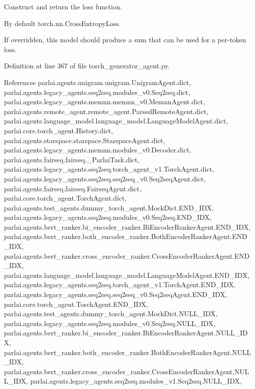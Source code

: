 \begin{DoxyVerb}Construct and return the loss function.

By default torch.nn.CrossEntropyLoss.

If overridden, this model should produce a sum that can be used for a per-token loss.
\end{DoxyVerb}
 

Definition at line 367 of file torch\+\_\+generator\+\_\+agent.\+py.



References parlai.\+agents.\+unigram.\+unigram.\+Unigram\+Agent.\+dict, parlai.\+agents.\+legacy\+\_\+agents.\+seq2seq.\+modules\+\_\+v0.\+Seq2seq.\+dict, parlai.\+agents.\+legacy\+\_\+agents.\+memnn.\+memnn\+\_\+v0.\+Memnn\+Agent.\+dict, parlai.\+agents.\+remote\+\_\+agent.\+remote\+\_\+agent.\+Parsed\+Remote\+Agent.\+dict, parlai.\+agents.\+language\+\_\+model.\+language\+\_\+model.\+Language\+Model\+Agent.\+dict, parlai.\+core.\+torch\+\_\+agent.\+History.\+dict, parlai.\+agents.\+starspace.\+starspace.\+Starspace\+Agent.\+dict, parlai.\+agents.\+legacy\+\_\+agents.\+memnn.\+modules\+\_\+v0.\+Decoder.\+dict, parlai.\+agents.\+fairseq.\+fairseq.\+\_\+\+Parlai\+Task.\+dict, parlai.\+agents.\+legacy\+\_\+agents.\+seq2seq.\+torch\+\_\+agent\+\_\+v1.\+Torch\+Agent.\+dict, parlai.\+agents.\+legacy\+\_\+agents.\+seq2seq.\+seq2seq\+\_\+v0.\+Seq2seq\+Agent.\+dict, parlai.\+agents.\+fairseq.\+fairseq.\+Fairseq\+Agent.\+dict, parlai.\+core.\+torch\+\_\+agent.\+Torch\+Agent.\+dict, parlai.\+agents.\+test\+\_\+agents.\+dummy\+\_\+torch\+\_\+agent.\+Mock\+Dict.\+E\+N\+D\+\_\+\+I\+DX, parlai.\+agents.\+legacy\+\_\+agents.\+seq2seq.\+modules\+\_\+v0.\+Seq2seq.\+E\+N\+D\+\_\+\+I\+DX, parlai.\+agents.\+bert\+\_\+ranker.\+bi\+\_\+encoder\+\_\+ranker.\+Bi\+Encoder\+Ranker\+Agent.\+E\+N\+D\+\_\+\+I\+DX, parlai.\+agents.\+bert\+\_\+ranker.\+both\+\_\+encoder\+\_\+ranker.\+Both\+Encoder\+Ranker\+Agent.\+E\+N\+D\+\_\+\+I\+DX, parlai.\+agents.\+bert\+\_\+ranker.\+cross\+\_\+encoder\+\_\+ranker.\+Cross\+Encoder\+Ranker\+Agent.\+E\+N\+D\+\_\+\+I\+DX, parlai.\+agents.\+language\+\_\+model.\+language\+\_\+model.\+Language\+Model\+Agent.\+E\+N\+D\+\_\+\+I\+DX, parlai.\+agents.\+legacy\+\_\+agents.\+seq2seq.\+torch\+\_\+agent\+\_\+v1.\+Torch\+Agent.\+E\+N\+D\+\_\+\+I\+DX, parlai.\+agents.\+legacy\+\_\+agents.\+seq2seq.\+seq2seq\+\_\+v0.\+Seq2seq\+Agent.\+E\+N\+D\+\_\+\+I\+DX, parlai.\+core.\+torch\+\_\+agent.\+Torch\+Agent.\+E\+N\+D\+\_\+\+I\+DX, parlai.\+agents.\+test\+\_\+agents.\+dummy\+\_\+torch\+\_\+agent.\+Mock\+Dict.\+N\+U\+L\+L\+\_\+\+I\+DX, parlai.\+agents.\+legacy\+\_\+agents.\+seq2seq.\+modules\+\_\+v0.\+Seq2seq.\+N\+U\+L\+L\+\_\+\+I\+DX, parlai.\+agents.\+bert\+\_\+ranker.\+bi\+\_\+encoder\+\_\+ranker.\+Bi\+Encoder\+Ranker\+Agent.\+N\+U\+L\+L\+\_\+\+I\+DX, parlai.\+agents.\+bert\+\_\+ranker.\+both\+\_\+encoder\+\_\+ranker.\+Both\+Encoder\+Ranker\+Agent.\+N\+U\+L\+L\+\_\+\+I\+DX, parlai.\+agents.\+bert\+\_\+ranker.\+cross\+\_\+encoder\+\_\+ranker.\+Cross\+Encoder\+Ranker\+Agent.\+N\+U\+L\+L\+\_\+\+I\+DX, parlai.\+agents.\+legacy\+\_\+agents.\+seq2seq.\+modules\+\_\+v1.\+Seq2seq.\+N\+U\+L\+L\+\_\+\+I\+DX, 